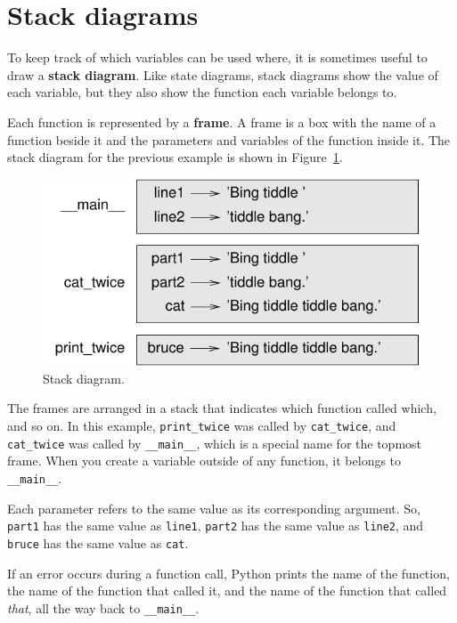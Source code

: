 \documentclass[10pt]{book}
\begin{document}
\section{Stack diagrams}
\label{stackdiagram}

To keep track of which variables can be used where, it is sometimes
useful to draw a {\bf stack diagram}.  Like state diagrams, stack
diagrams show the value of each variable, but they also show the
function each variable belongs to.

Each function is represented by a {\bf frame}.  A frame is a box with
the name of a function beside it and the parameters and variables of
the function inside it.  The stack diagram for the previous example is
shown in Figure~\ref{fig.stack}.

\begin{figure}
\centerline
{\includegraphics[scale=0.8]{figs/stack.pdf}}
\caption{Stack diagram.}
\label{fig.stack}
\end{figure}


The frames are arranged in a stack that indicates which function
called which, and so on.  In this example, \verb"print_twice"
was called by \verb"cat_twice", and \verb"cat_twice" was called by 
\verb"__main__", which is a special name for the topmost frame.  When
you create a variable outside of any function, it belongs to 
\verb"__main__".


Each parameter refers to the same value as its corresponding
argument.  So, {\tt part1} has the same value as
{\tt line1}, {\tt part2} has the same value as {\tt line2},
and {\tt bruce} has the same value as {\tt cat}.

If an error occurs during a function call, Python prints the
name of the function, the name of the function that called
it, and the name of the function that called {\em that}, all the
way back to \verb"__main__".
\end{document}

